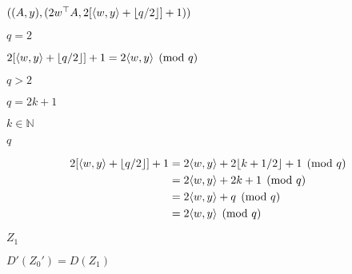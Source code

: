 \documentclass[10pt]{book}
\begin{document}
\begin{mdSnippets}
\begin{mdInlineSnippet}[63fcafd6aa460e5f52bb4777a69302e4]%
$((A,y), (2w^\top A, 2[\langle w,y \rangle + \lfloor q/2 \rfloor] + 1))$\end{mdInlineSnippet}%
\begin{mdInlineSnippet}[03e344c5d678f065203d644e6cd8f6a0]%
$q = 2$\end{mdInlineSnippet}%
\begin{mdInlineSnippet}[28e24b33ef57b8f38efa9bf42664c8fd]%
$2[\langle w,y \rangle + \lfloor q/2 \rfloor] + 1 = 2\langle w,y \rangle \pmod q$\end{mdInlineSnippet}%
\begin{mdInlineSnippet}%
$q > 2$\end{mdInlineSnippet}%
\begin{mdInlineSnippet}[96b09b7dbe71b5a1bb3143a5d088b933]%
$q = 2k + 1$\end{mdInlineSnippet}%
\begin{mdInlineSnippet}%
$k \in \mathbb{N}$\end{mdInlineSnippet}%
\begin{mdInlineSnippet}[7694f4a66316e53c8cdd9d9954bd611d]%
$q$\end{mdInlineSnippet}%
\begin{mdDisplaySnippet}[5f6c88a021014f8779e0f2ba33d26244]%
\[%
\begin{aligned}
2[\iprod{w,y} + \lfloor q/2 \rfloor] + 1 &= 2\iprod{w,y} + 2\lfloor k +  1/2 \rfloor + 1 \pmod{q}\\
&= 2\iprod{w,y} + 2k + 1 \pmod{q} \\
&= 2\iprod{w,y} + q \pmod{q} \\
&= 2\iprod{w,y} \pmod{q}
\end{aligned}
\]%
\end{mdDisplaySnippet}%
\begin{mdInlineSnippet}[c6847901dd09a7efd9dd75477a521329]%
$Z_1$\end{mdInlineSnippet}%
\begin{mdInlineSnippet}[b360c777f002cdb25e5278b59293eb42]%
$D'(Z_0') = D(Z_1)$\end{mdInlineSnippet}%
\begin{mdInlineSnippet}%

\end{mdInlineSnippet}
\end{mdSnippets}
\end{document}
